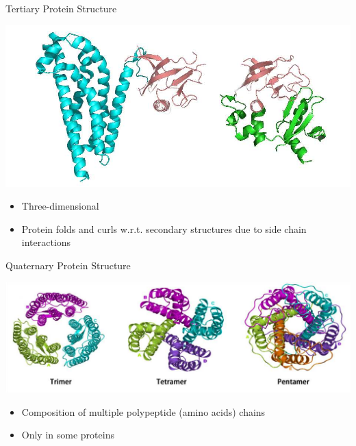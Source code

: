 \begin{frame}{Tertiary Protein Structure}
	\begin{center}
		\includegraphics[scale=0.49]{images/tertiary_protein_structure.png}
	\end{center}
	\begin{itemize}
		\item Three-dimensional
		\item Protein folds and curls w.r.t. secondary structures due to side chain interactions
	\end{itemize}
\end{frame}

\begin{frame}{Quaternary Protein Structure}
\begin{center}
	\includegraphics[scale=0.39]{images/quaternary_protein_structure.jpg}
\end{center}
\begin{itemize}
	\item Composition of multiple polypeptide (amino acids) chains
	\item Only in some proteins
\end{itemize}
\end{frame}